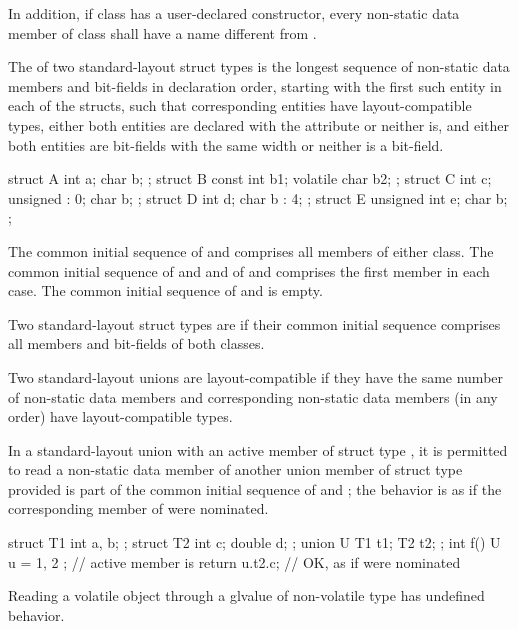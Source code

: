\pnum
In addition, if class  has a user-declared
constructor, every non-static data member of class
 shall have a name different from .

\pnum
The  of two standard-layout struct
types is the longest sequence of non-static data
members and bit-fields in declaration order, starting with the first
such entity in each of the structs, such that corresponding entities
have layout-compatible types,
either both entities are declared with
the  attribute
or neither is,
and either both entities are bit-fields with the same width
or neither is a bit-field.
\begin{example}
\begin{codeblock}
  struct A { int a; char b; };
  struct B { const int b1; volatile char b2; };
  struct C { int c; unsigned : 0; char b; };
  struct D { int d; char b : 4; };
  struct E { unsigned int e; char b; };
\end{codeblock}
The common initial sequence of  and  comprises all members
of either class. The common initial sequence of  and  and
of  and  comprises the first member in each case.
The common initial sequence of  and  is empty.
\end{example}

\pnum
Two standard-layout struct types are
 if
their common initial sequence comprises all members and bit-fields of
both classes.

\pnum
Two standard-layout unions are layout-compatible if they
have the same number of non-static data members and corresponding
non-static data members (in any order) have layout-compatible
types.

\pnum
In a standard-layout union with an active member
of struct type , it is permitted to read a non-static
data member  of another union member of struct type 
provided  is part of the common initial sequence of  and ;
the behavior is as if the corresponding member of  were nominated.
\begin{example}
\begin{codeblock}
struct T1 { int a, b; };
struct T2 { int c; double d; };
union U { T1 t1; T2 t2; };
int f() {
  U u = { { 1, 2 } };   // active member is 
  return u.t2.c;        // OK, as if  were nominated
}
\end{codeblock}
\end{example}
\begin{note}
Reading a volatile object through a glvalue of non-volatile type has
undefined behavior.
\end{note}

